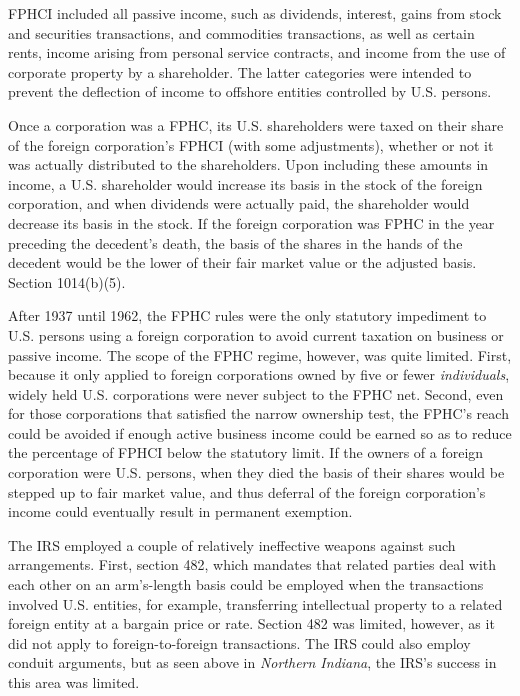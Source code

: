 FPHCI included all passive income, such as dividends, interest, gains from stock and securities transactions, and commodities transactions, as well as certain rents, income arising from personal service contracts, and income from the use of corporate property by a shareholder.  The latter categories were intended to prevent the deflection of income to offshore entities controlled by U.S. persons.    

Once a corporation was a FPHC, its U.S. shareholders were taxed on their share of the foreign corporation's FPHCI (with some adjustments), whether or not it was actually distributed to the shareholders.  Upon including these amounts in income, a U.S. shareholder would increase its basis in the stock of the foreign corporation, and when dividends were actually paid, the shareholder would decrease its basis in the stock.  If the foreign corporation was FPHC in the year preceding the decedent's death, the basis of the shares in the hands of the decedent would be the lower of their fair market value or the adjusted basis.  Section 1014(b)(5).

After 1937 until 1962, the FPHC rules were the only statutory impediment to U.S. persons using a foreign corporation to avoid current taxation on business or passive income.  The scope of the FPHC regime, however, was quite limited.  First, because it only applied to foreign corporations owned by five or fewer \emph{individuals}, widely held U.S. corporations were never subject to the FPHC net.  Second, even for those corporations that satisfied the narrow ownership test, the FPHC's reach could be avoided if enough active business income could be earned so as to reduce the percentage of FPHCI below the statutory limit.  If the owners of a foreign corporation were U.S. persons, when they died the basis of their shares would be stepped up to fair market value, and thus deferral of the foreign corporation's income could eventually result in permanent exemption.

The IRS employed a couple of relatively ineffective weapons against such arrangements.  First, section 482, which mandates that related parties deal with each other on an arm's-length basis could be employed when the transactions involved U.S. entities, for example, transferring intellectual property to a related foreign entity at a bargain price or rate.  Section 482 was limited, however, as it did not apply to foreign-to-foreign transactions.  The IRS could also employ conduit arguments, but as seen above in \emph{Northern Indiana}, the IRS's success in this area was limited.  

